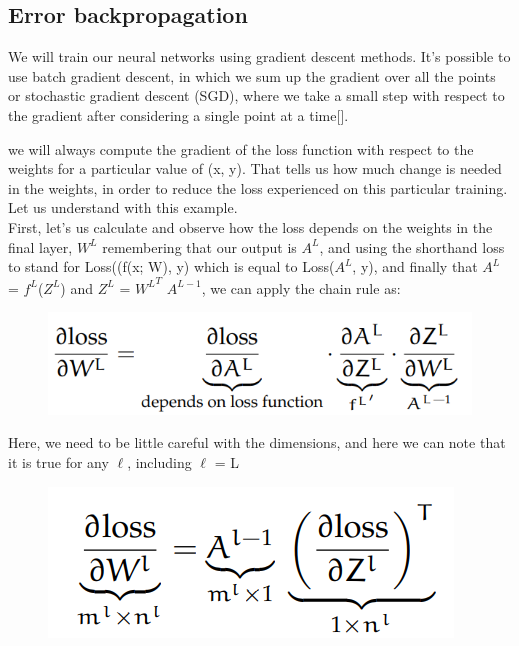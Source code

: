 \subsection{Error backpropagation}
We will train our neural networks using gradient descent methods. It’s possible to use batch gradient descent, in which we sum up the gradient over all the points or stochastic gradient descent (SGD), where we take a small step with respect to the gradient after considering a single point at a time[\cite{23}].

we will always compute the gradient of the loss function with respect
to the weights for a particular value of (x, y). That tells us how much change is needed in the
weights, in order to reduce the loss experienced on this particular training. Let us understand with this example.\\
First, let’s us calculate and observe how the loss depends on the weights in the final layer, $W^L$ remembering
that our output is $A^L$, and using the shorthand loss to stand for Loss((f(x; W), y) which
is equal to Loss($A^L$, y), and finally that $A^L$ = $f^L$($Z^L$) and $Z^L$ = ${W^L}^T$ $A^{L-1}$, we can apply the chain  rule as:
\begin{figure}[H]
    \centering
    \includegraphics[scale = 0.3]{Figures/ml__6.png}
    \label{fig:my_label}
\end{figure}
Here, we need to be little careful with the dimensions, and here we can note that it is true for any $ \ell$, including $ \ell$ = L\\
\begin{figure}[H]
    \centering
    \includegraphics[scale=0.3]{Figures/ml__7.png}
\end{figure}
